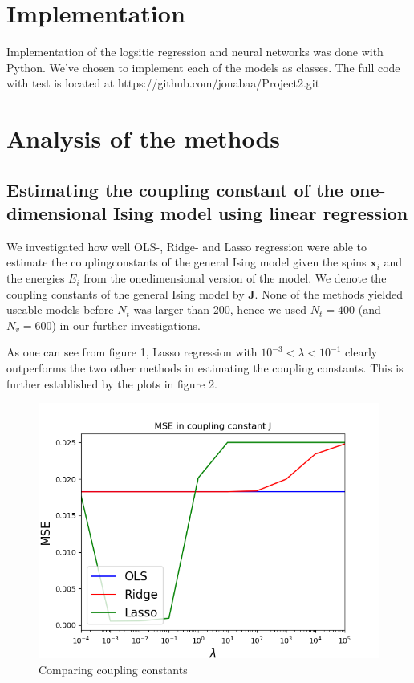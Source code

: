 \documentclass[a4paper,english]{article}
\begin{document}
\section{Implementation}
Implementation of the logsitic regression and neural networks was done 
with Python. We've chosen to implement each of the models as classes. 
The full code with test is located at 
https://github.com/jonabaa/Project2.git

\section{Analysis of the methods}
\subsection{Estimating the coupling constant of the one-dimensional 
Ising model using linear regression}
We investigated how well OLS-, Ridge- and Lasso regression were able
to estimate the couplingconstants 
of the general Ising model 
given the spins $\bm{x}_i$ and the energies $E_i$ from
the onedimensional version of the model. We denote the coupling constants
of the general Ising model by $\bm{J}$.
None of the methods yielded useable models before $N_t$ was larger than
$200$, hence we used $N_t=400$ (and $N_v=600$) in our further
investigations. 

\par
As one can see from figure 1, Lasso regression with 
$10^{-3} < \lambda < 10^{-1}$ clearly outperforms the two other methods
in estimating the coupling constants. This is further established
by the plots in figure 2.
\begin{figure}
    \includegraphics[scale=.7]{MSE_J_N1000_train4test6.png}
    \caption{Comparing coupling constants}
\end{figure}
\end{document}
